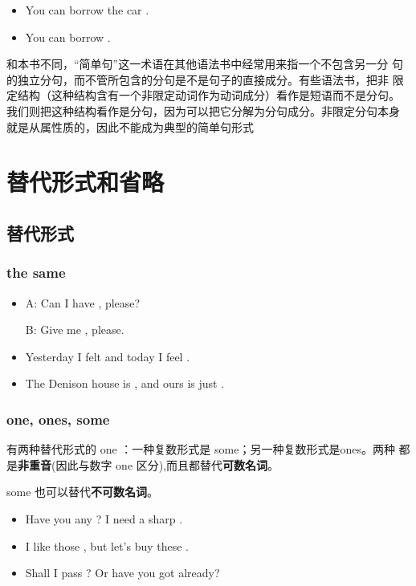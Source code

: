 \begin{itemize}
\item You can borrow the car .
\item You can borrow .
\end{itemize}

和本书不同，“简单句”这一术语在其他语法书中经常用来指一个不包含另一分
句的独立分句，而不管所包含的分句是不是句子的直接成分。有些语法书，把非
限定结构（这种结构含有一个非限定动词作为动词成分）看作是短语而不是分句。
我们则把这种结构看作是分句，因为可以把它分解为分句成分。非限定分句本身
就是从属性质的，因此不能成为典型的简单句形式

\section{替代形式和省略}

\subsection{替代形式}

\subsubsection{the same}

\begin{itemize}
\item A: Can I have , please?

  B: Give me , please.

\item Yesterday I felt  and today I feel .

\item The Denison house is , and ours is
  just .

\end{itemize}

\subsubsection{one, ones, some}

有两种替代形式的 one ：一种复数形式是 some；另一种复数形式是ones。两种
都是\textbf{非重音}(因此与数字 one 区分),而且都替代\textbf{可数名词}。

some 也可以替代\textbf{不可数名词}。
\begin{itemize}
\item Have you any ? I need a sharp .
\item I like those , but let's buy these .

\item Shall I pass ? Or have you got  already?
\end{itemize}


